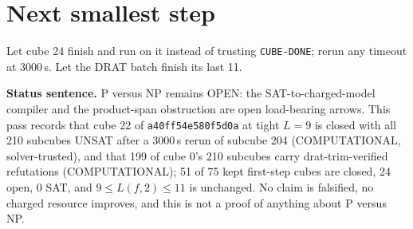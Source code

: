 \documentclass[11pt]{article}
\begin{document}
\section*{Next smallest step}
Let cube 24 finish and run  on it instead of trusting \texttt{CUBE-DONE}; rerun any timeout at 3000\,s. Let the DRAT batch finish its last 11.

\bigskip
\noindent\textbf{Status sentence.} P versus NP remains OPEN: the SAT-to-charged-model compiler and the product-span obstruction are open load-bearing arrows. This pass records that cube 22 of \texttt{a40ff54e580f5d0a} at tight $L=9$ is closed with all 210 subcubes UNSAT after a 3000\,s rerun of subcube 204 (COMPUTATIONAL, solver-trusted), and that 199 of cube 0's 210 subcubes carry drat-trim-verified refutations (COMPUTATIONAL); 51 of 75 kept first-step cubes are closed, 24 open, 0 SAT, and $9\le L(f,2)\le 11$ is unchanged. No claim is falsified, no charged resource improves, and this is not a proof of anything about P versus NP.
\end{document}
